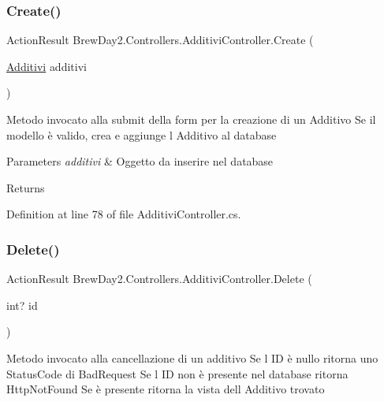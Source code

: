 \subsubsection{\texorpdfstring{Create()}{Create()}\hspace{0.1cm}{\footnotesize\ttfamily [2/2]}}
{\footnotesize\ttfamily Action\+Result Brew\+Day2.\+Controllers.\+Additivi\+Controller.\+Create (\begin{DoxyParamCaption}\item[{\mbox{\hyperlink{class_brew_day2_1_1_models_1_1_additivi}{Additivi}}}]{additivi }\end{DoxyParamCaption})}



Metodo invocato alla submit della form per la creazione di un Additivo Se il modello è valido, crea e aggiunge l\textquotesingle{} Additivo al database 


\begin{DoxyParams}{Parameters}
{\em additivi} & Oggetto da inserire nel database\\
\hline
\end{DoxyParams}
\begin{DoxyReturn}{Returns}

\end{DoxyReturn}


Definition at line 78 of file Additivi\+Controller.\+cs.

\mbox{\label{class_brew_day2_1_1_controllers_1_1_additivi_controller_a444b3db44aec4ff853dadb3312b81372}} 
\subsubsection{\texorpdfstring{Delete()}{Delete()}}
{\footnotesize\ttfamily Action\+Result Brew\+Day2.\+Controllers.\+Additivi\+Controller.\+Delete (\begin{DoxyParamCaption}\item[{int?}]{id }\end{DoxyParamCaption})}



Metodo invocato alla cancellazione di un additivo Se l\textquotesingle{} ID è nullo ritorna uno Status\+Code di Bad\+Request Se l\textquotesingle{} ID non è presente nel database ritorna Http\+Not\+Found Se è presente ritorna la vista dell\textquotesingle{} Additivo trovato 



